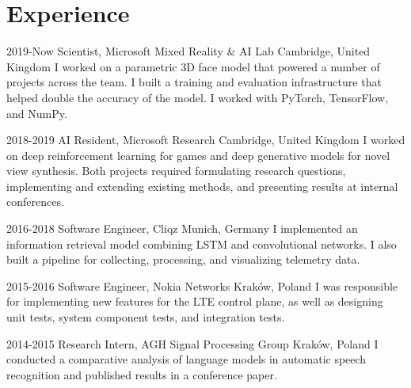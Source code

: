 \documentclass[]{friggeri-cv_osx}
\begin{document}
\vspace{5mm}
\begin{center}
\href{https://sebastiandziadzio.com}{\color{gray} \Large \faHome} \hspace{0.05cm}
\href{https://github.com/sebastiandziadzio}{\color{gray} \Large \faGithub} \hspace{0.05cm}
\href{mailto:sebastian.dziadzio@gmail.com}{\color{gray} \Large\faEnvelope} \hspace{0.05cm}
\href{https://twitter.com/sebadzia}{\color{gray} \Large\faTwitter} \hspace{0.05cm}
\href{https://pl.linkedin.com/in/sebastiandziadzio}{\color{gray} \Large\faLinkedin} \hspace{0.05cm}
\end{center}
\vspace{2mm}

\section{Experience}
\begin{entrylist}
\entry
{2019-Now}
{Scientist, Microsoft Mixed Reality \& AI Lab}
{Cambridge, United Kingdom}
{I worked on a parametric 3D face model that powered a number of projects across the team. I built a training and evaluation infrastructure
that helped double the accuracy of the model. I worked with PyTorch, TensorFlow, and NumPy.\\}

\entry
{2018-2019}
{AI Resident, Microsoft Research}
{Cambridge, United Kingdom}
{I worked on deep reinforcement learning for games and deep generative models for novel view synthesis. Both projects required
formulating research questions, implementing and extending existing methods, and presenting results at internal conferences.\\}

\entry
{2016-2018}
{Software Engineer, Cliqz}
{Munich, Germany}
{I implemented an information retrieval model combining LSTM and convolutional networks. I also built a pipeline for
collecting, processing, and visualizing telemetry data.\\}

\entry
{2015-2016}
{Software Engineer, Nokia Networks}
{Kraków, Poland}
{I was responsible for implementing new features for the LTE control plane, as well as designing unit tests, system component tests,
and integration tests.\\}

\entry
{2014-2015}
{Research Intern, AGH Signal Processing Group}
{Kraków, Poland}
{I conducted a comparative analysis of language models in automatic speech recognition and published results in a conference paper.\\}
\end{entrylist}
\end{document}
